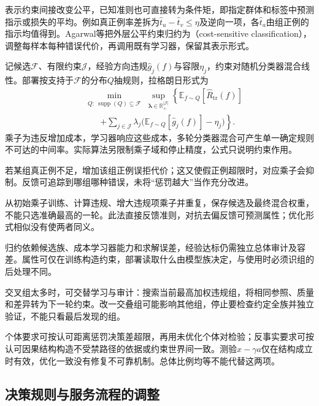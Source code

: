 表示约束间接改变公平，已知准则也可直接转为条件矩，即指定群体和标签中预测指示或损失的平均。例如真正例率差拆为$\hat t_u-\hat t_v\leq\eta$及逆向一项，各$\hat t_a$由组正例的指示均值得到。Agarwal等把外层公平约束归约为（cost-sensitive classification），调整每样本每种错误代价，再调用既有学习器，保留其表示形式。

记候选$\mathcal F$、有限约束$\mathcal J$，经验方向违规$\hat g_j(f)$与容限$\eta_j$，约束对随机分类器混合线性。部署按支持于$\mathcal F$的分布$Q$抽规则，拉格朗日形式为
\begin{equation}
\begin{aligned}
 &\min_{\substack{Q:\ \operatorname{supp}(Q)\subseteq\mathcal F}}
 \sup_{\bm{\lambda}\in\mathbb R_+^{|\mathcal J|}}
 \left\{\mathbb E_{f\sim Q}[\widehat R_{\mathrm{tr}}(f)]\right.\\
 &\qquad\left.+
 \sum_{j\in\mathcal J}\lambda_j
 \bigl(\mathbb E_{f\sim Q}[\hat g_j(f)]-\eta_j\bigr)
 \right\}.
\end{aligned}
 \label{eq:fairness-reduction}
\end{equation}
乘子为违反增加成本，学习器响应这些成本，多轮分类器混合可产生单一确定规则不可达的中间率。实际算法另限制乘子域和停止精度，公式只说明约束作用。

若某组真正例不足，增加该组正例误拒代价；这又使假正例超限时，对应乘子会抑制。反馈可追踪到哪组哪种错误，未将“惩罚越大”当作充分改进。

从初始乘子训练、计算违规、增大违规项乘子并重复，保存候选及最终混合权重，不能只选准确最高的一轮。此法直接反馈准则，对抗去偏反馈可预测属性；优化形式相似没有使两者同义。

归约依赖候选族、成本学习器能力和求解误差，经验达标仍需独立总体审计及容差。属性可仅在训练构造约束，部署读取什么由模型族决定，与使用时必须识组的后处理不同。

交叉组太多时，可交替学习与审计：搜索当前最高加权违规组，将相同参照、质量和差异转为下一轮约束。改一交叠组可能影响其他组，停止要检查约定全族并独立验证，不能只看最后发现的组。

个体要求可按认可距离惩罚决策差超限，再用未优化个体对检验；反事实要求可按认可因果结构构造不受禁路径的依据或约束世界间一致。测验$x-\gamma a$仅在结构成立时有效，优化一致没有修复不可靠机制。总体比例均等不能代替这两项。

\subsection{决策规则与服务流程的调整}
\label{sec:fairness-decision-intervention}

